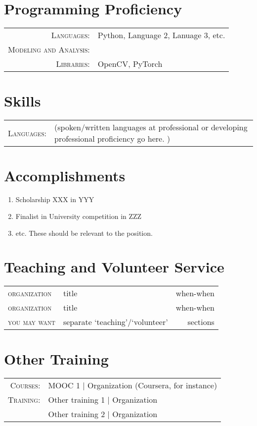 \documentclass[a4paper,11pt]{article}
\begin{document}
\section{Programming Proficiency}
\begin{tabular}{rl}
  \textsc{Languages:}& Python, Language 2, Lanuage 3, etc.\\
  \textsc{Modeling and Analysis:}& \\
  \textsc{Libraries:}& OpenCV, PyTorch \\
\end{tabular}

\section{Skills}
\begin{tabular}{rl}
  \textsc{Languages:}& (spoken/written languages at professional or developing professional proficiency go here. )\\
\end{tabular}

\section{Accomplishments}
\begin{enumerate}[noitemsep, leftmargin=*,label={}]
	\item{Scholarship XXX in YYY }
	\item{Finalist in University competition in ZZZ}
	\item{etc.  These should be relevant to the position.}
\end{enumerate}

\section{Teaching and Volunteer Service}
\begin{tabular}{llr}
	 \textsc{organization}& title & when-when\\
	 \textsc{organization}& title & when-when\\
	 \textsc{you may want}& separate `teaching'/`volunteer'& sections\\
\end{tabular}

\section{Other Training}
\begin{tabular}{rl}
  \textsc{Courses:}
  &MOOC 1 | Organization (Coursera, for instance)\\
  \textsc{Training:}
  &Other training 1 | Organization\\
  &Other training 2 | Organization
\end{tabular}
\end{document}

